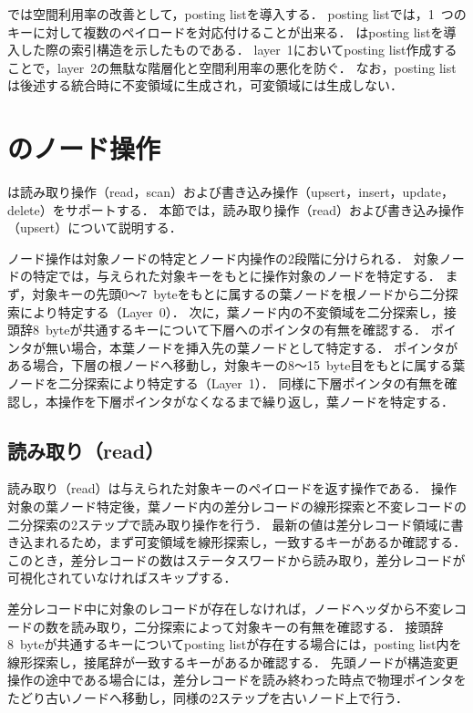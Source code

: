 \Bcforest{}では空間利用率の改善として，posting listを導入する．
posting listでは，1~つのキーに対して複数のペイロードを対応付けることが出来る．
\Fig{\ref{fig:posting_list}}はposting listを導入した際の索引構造を示したものである．
layer~1においてposting list作成することで，layer~2の無駄な階層化と空間利用率の悪化を防ぐ．
なお，posting listは後述する統合時に不変領域に生成され，可変領域には生成しない．

\section{\Bcforest{}のノード操作}
\label{sec:node_operation}
\Bcforest{}は読み取り操作（read，scan）および書き込み操作（upsert，insert，update，delete）をサポートする．
本節では，読み取り操作（read）および書き込み操作（upsert）について説明する．

ノード操作は対象ノードの特定とノード内操作の2段階に分けられる．
対象ノードの特定では，与えられた対象キーをもとに操作対象のノードを特定する．
まず，対象キーの先頭0～7~byteをもとに属するの葉ノードを根ノードから二分探索により特定する（Layer~0）．
次に，葉ノード内の不変領域を二分探索し，接頭辞8~byteが共通するキーについて下層へのポインタの有無を確認する．
ポインタが無い場合，本葉ノードを挿入先の葉ノードとして特定する．
ポインタがある場合，下層の根ノードへ移動し，対象キーの8～15~byte目をもとに属する葉ノードを二分探索により特定する（Layer~1）．
同様に下層ポインタの有無を確認し，本操作を下層ポインタがなくなるまで繰り返し，葉ノードを特定する．

\subsection{読み取り（read）}
読み取り（read）は与えられた対象キーのペイロードを返す操作である．
操作対象の葉ノード特定後，葉ノード内の差分レコードの線形探索と不変レコードの二分探索の2ステップで読み取り操作を行う．
最新の値は差分レコード領域に書き込まれるため，まず可変領域を線形探索し，一致するキーがあるか確認する．
このとき，差分レコードの数はステータスワードから読み取り，差分レコードが可視化されていなければスキップする．

差分レコード中に対象のレコードが存在しなければ，ノードヘッダから不変レコードの数を読み取り，二分探索によって対象キーの有無を確認する．
接頭辞8~byteが共通するキーについてposting listが存在する場合には，posting list内を線形探索し，接尾辞が一致するキーがあるか確認する．
先頭ノードが構造変更操作の途中である場合には，差分レコードを読み終わった時点で物理ポインタをたどり古いノードへ移動し，同様の2ステップを古いノード上で行う．

